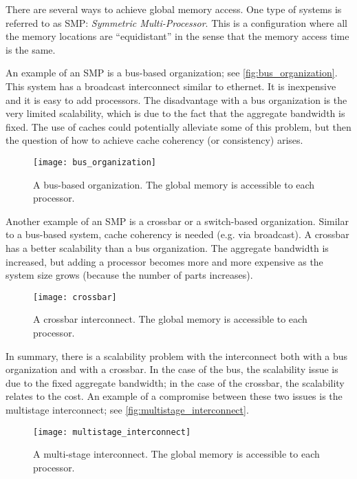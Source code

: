 There are several ways to achieve global memory access. One type of systems is
referred to as SMP: \emph{Symmetric Multi-Processor}. This is a configuration
where all the memory locations are ``equidistant'' in the sense that the memory
access time is the same.

An example of an SMP is a bus-based organization; see
\autoref{fig:bus_organization}. This system has a broadcast interconnect similar
to ethernet. It is inexpensive and it is easy to add processors. The
disadvantage with a bus organization is the very limited scalability, which is
due to the fact that the aggregate bandwidth is fixed. The use of caches could
potentially alleviate some of this problem, but then the question of how to
achieve cache coherency (or consistency) arises.

\begin{figure}[htbp]
  \begin{center}
    \texttt{[image: bus\_organization]}
  \end{center}
  \caption{
    A bus-based organization. The global memory is accessible to each processor.
  }
  \label{fig:bus_organization}
\end{figure}

Another example of an SMP is a crossbar or a switch-based organization. Similar
to a bus-based system, cache coherency is needed (e.g. via broadcast). A
crossbar has a better scalability than a bus organization. The aggregate
bandwidth is increased, but adding a processor becomes more and more expensive
as the system size grows (because the number of parts increases).

\begin{figure}[htbp]
  \begin{center}
    \texttt{[image: crossbar]}
  \end{center}
  \caption{
    A crossbar interconnect. The global memory is accessible to each processor.
  }
  \label{fig:crossbar}
\end{figure}

In summary, there is a scalability problem with the interconnect both with a bus
organization and with a crossbar. In the case of the bus, the scalability issue
is due to the fixed aggregate bandwidth; in the case of the crossbar, the
scalability relates to the cost. An example of a compromise between these two
issues is the multistage interconnect; see
\autoref{fig:multistage_interconnect}.

\begin{figure}[htbp]
  \begin{center}
    \texttt{[image: multistage\_interconnect]}
  \end{center}
  \caption{
    A multi-stage interconnect. The global memory is accessible to each processor.
  }
  \label{fig:multistage_interconnect}
\end{figure}

